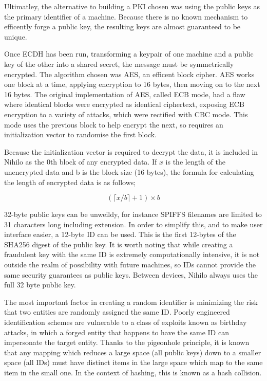 \documentclass{article}
\begin{document}
Ultimatley, the alternative to building a PKI chosen was using the public keys as the primary identifier of a machine. Because there is no known mechanism to efficently forge a public key, the resulting keys are almost guaranteed to be unique.

Once ECDH has been run, transforming a keypair of one machine and a public key of the other into a shared secret, the message must be symmetrically encrypted. The algorithm chosen was AES\cite{aes}, an efficent block cipher. AES works one block at a time, applying encryption to 16 bytes, then moving on to the next 16 bytes. The original implementation of AES, called ECB mode, had a flaw where identical blocks were encrypted as identical ciphertext, exposing ECB encryption to a variety of attacks, which were rectified with CBC mode. This mode uses the previous block to help encrypt the next, so requires an initialization vector to randomise the first block.

Because the initialization vector is required to decrypt the data, it is included in Nihilo as the 0th block of any encrypted data. If \(x\) is the length of the unencrypted data and b is the block size (16 bytes), the formula for calculating the length of encrypted data is as follows;

\[ ( \lceil x/b \rceil +1) \times b\]

32-byte public keys can be unweildy, for instance SPIFFS filenames are limited to 31 characters long including extension. In order to simplify this, and to make user interface easier, a 12-byte ID can be used. This is the first 12-bytes of the SHA256 digest of the public key. It is worth noting that while creating a fraudulent key with the same ID is extremely computationally intensive, it is not outside the realm of possibility with future machines, so IDs cannot provide the same security guarantees as public keys. Between devices, Nihilo always uses the full 32 byte public key.

The most important factor in creating a random identifier is minimizing the risk that two entities are randomly assigned the same ID. Poorly engineered identification schemes are vulnerable to a class of exploits known as birthday attacks, in which a forged entity that happens to have the same ID can impersonate the target entity. Thanks to the pigeonhole principle\cite{pigeon}, it is known that any mapping which reduces a large space (all public keys) down to a smaller space (all IDs) must have distinct items in the large space which map to the same item in the small one. In the context of hashing, this is known as a hash collision.
\end{document}
